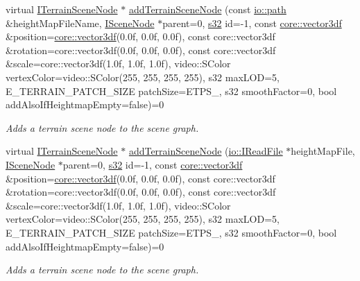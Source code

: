 \begin{DoxyCompactItemize}
virtual \hyperlink{classirr_1_1scene_1_1ITerrainSceneNode}{I\+Terrain\+Scene\+Node} $\ast$ \hyperlink{classirr_1_1scene_1_1ISceneManager_a2188fb0443c7e0b6b69a673ca1d9ca5c}{add\+Terrain\+Scene\+Node} (const \hyperlink{namespaceirr_1_1io_a6468281622ce3a1c46b72e19f32dded5}{io\+::path} \&height\+Map\+File\+Name, \hyperlink{classirr_1_1scene_1_1ISceneNode}{I\+Scene\+Node} $\ast$parent=0, \hyperlink{namespaceirr_ac66849b7a6ed16e30ebede579f9b47c6}{s32} id=-\/1, const \hyperlink{namespaceirr_1_1core_ae6e2b2a6c552833ebbd5b7463d03586b}{core\+::vector3df} \&position=\hyperlink{namespaceirr_1_1core_ae6e2b2a6c552833ebbd5b7463d03586b}{core\+::vector3df}(0.\+0f, 0.\+0f, 0.\+0f), const core\+::vector3df \&rotation=core\+::vector3df(0.\+0f, 0.\+0f, 0.\+0f), const core\+::vector3df \&scale=core\+::vector3df(1.\+0f, 1.\+0f, 1.\+0f), video\+::\+S\+Color vertex\+Color=video\+::\+S\+Color(255, 255, 255, 255), s32 max\+L\+O\+D=5, E\+\_\+\+T\+E\+R\+R\+A\+I\+N\+\_\+\+P\+A\+T\+C\+H\+\_\+\+S\+I\+Z\+E patch\+Size=\+E\+T\+P\+S\+\_, s32 smooth\+Factor=0, bool add\+Also\+If\+Heightmap\+Empty=false)=0
\begin{DoxyCompactList}\small\item\em Adds a terrain scene node to the scene graph. \end{DoxyCompactList}\item 
virtual \hyperlink{classirr_1_1scene_1_1ITerrainSceneNode}{I\+Terrain\+Scene\+Node} $\ast$ \hyperlink{classirr_1_1scene_1_1ISceneManager_ae89a0a2d162a86f087eec66ddcd801b6}{add\+Terrain\+Scene\+Node} (\hyperlink{classirr_1_1io_1_1IReadFile}{io\+::\+I\+Read\+File} $\ast$height\+Map\+File, \hyperlink{classirr_1_1scene_1_1ISceneNode}{I\+Scene\+Node} $\ast$parent=0, \hyperlink{namespaceirr_ac66849b7a6ed16e30ebede579f9b47c6}{s32} id=-\/1, const \hyperlink{namespaceirr_1_1core_ae6e2b2a6c552833ebbd5b7463d03586b}{core\+::vector3df} \&position=\hyperlink{namespaceirr_1_1core_ae6e2b2a6c552833ebbd5b7463d03586b}{core\+::vector3df}(0.\+0f, 0.\+0f, 0.\+0f), const core\+::vector3df \&rotation=core\+::vector3df(0.\+0f, 0.\+0f, 0.\+0f), const core\+::vector3df \&scale=core\+::vector3df(1.\+0f, 1.\+0f, 1.\+0f), video\+::\+S\+Color vertex\+Color=video\+::\+S\+Color(255, 255, 255, 255), s32 max\+L\+O\+D=5, E\+\_\+\+T\+E\+R\+R\+A\+I\+N\+\_\+\+P\+A\+T\+C\+H\+\_\+\+S\+I\+Z\+E patch\+Size=\+E\+T\+P\+S\+\_, s32 smooth\+Factor=0, bool add\+Also\+If\+Heightmap\+Empty=false)=0
\begin{DoxyCompactList}\small\item\em Adds a terrain scene node to the scene graph. \end{DoxyCompactList}\item 

\end{DoxyCompactItemize}

